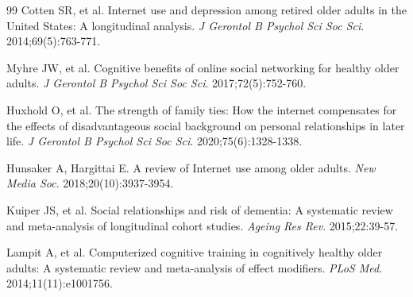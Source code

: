 \documentclass[10pt]{article}
\begin{document}
\begin{thebibliography}{99}
Cotten SR, et al. Internet use and depression among retired older adults in the United States: A longitudinal analysis. \textit{J Gerontol B Psychol Sci Soc Sci}. 2014;69(5):763-771.

Myhre JW, et al. Cognitive benefits of online social networking for healthy older adults. \textit{J Gerontol B Psychol Sci Soc Sci}. 2017;72(5):752-760.

Huxhold O, et al. The strength of family ties: How the internet compensates for the effects of disadvantageous social background on personal relationships in later life. \textit{J Gerontol B Psychol Sci Soc Sci}. 2020;75(6):1328-1338.

Hunsaker A, Hargittai E. A review of Internet use among older adults. \textit{New Media Soc}. 2018;20(10):3937-3954.

Kuiper JS, et al. Social relationships and risk of dementia: A systematic review and meta-analysis of longitudinal cohort studies. \textit{Ageing Res Rev}. 2015;22:39-57.

Lampit A, et al. Computerized cognitive training in cognitively healthy older adults: A systematic review and meta-analysis of effect modifiers. \textit{PLoS Med}. 2014;11(11):e1001756.

\end{thebibliography}
\end{document}

